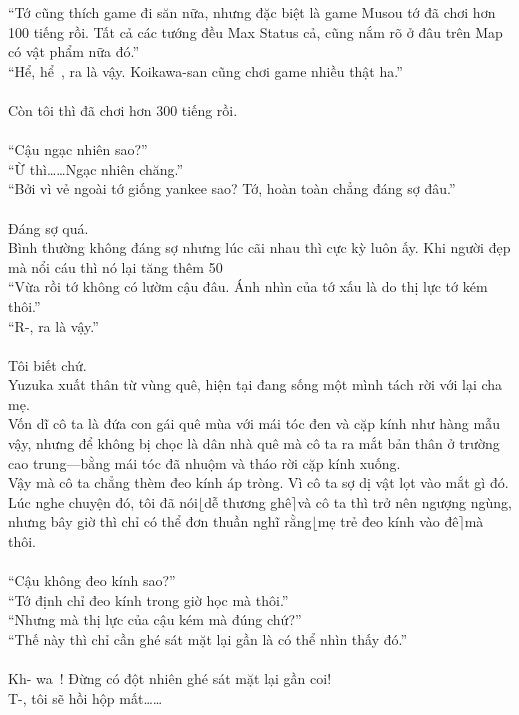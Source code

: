 \documentclass[12pt,a4paper, twosides]{book}
\begin{document}
“Tớ cũng thích game đi săn nữa, nhưng đặc biệt là game Musou tớ đã chơi hơn 100 tiếng rồi. Tất cả các tướng đều Max Status cả, cũng nắm rõ ở đâu trên Map có vật phẩm nữa đó.”\\
“Hể, hể~, ra là vậy. Koikawa-san cũng chơi game nhiều thật ha.”\\
\\
Còn tôi thì đã chơi hơn 300 tiếng rồi.\\
\\
“Cậu ngạc nhiên sao?”\\
“Ừ thì……Ngạc nhiên chăng.”\\
“Bởi vì vẻ ngoài tớ giống yankee sao? Tớ, hoàn toàn chẳng đáng sợ đâu.”\\
\\
Đáng sợ quá.\\
Bình thường không đáng sợ nhưng lúc cãi nhau thì cực kỳ luôn ấy. Khi người đẹp mà nổi cáu thì nó lại tăng thêm 50%
\\
“Vừa rồi tớ không có lườm cậu đâu. Ánh nhìn của tớ xấu là do thị lực tớ kém thôi.”\\
“R-, ra là vậy.”\\
\\
Tôi biết chứ.\\
Yuzuka xuất thân từ vùng quê, hiện tại đang sống một mình tách rời với lại cha mẹ.\\
Vốn dĩ cô ta là đứa con gái quê mùa với mái tóc đen và cặp kính như hàng mẫu vậy, nhưng để không bị chọc là dân nhà quê mà cô ta ra mắt bản thân ở trường cao trung—bằng mái tóc đã nhuộm và tháo rời cặp kính xuống.\\
Vậy mà cô ta chẳng thèm đeo kính áp tròng. Vì cô ta sợ dị vật lọt vào mắt gì đó.\\
Lúc nghe chuyện đó, tôi đã nói$\lfloor$dễ thương ghê$\rceil$và cô ta thì trở nên ngượng ngùng, nhưng bây giờ thì chỉ có thể đơn thuần nghĩ rằng$\lfloor$mẹ trẻ đeo kính vào đê$\rceil$mà thôi.\\
\\
“Cậu không đeo kính sao?”\\
“Tớ định chỉ đeo kính trong giờ học mà thôi.”\\
“Nhưng mà thị lực của cậu kém mà đúng chứ?”\\
“Thế này thì chỉ cần ghé sát mặt lại gần là có thể nhìn thấy đó.”\\
\\
Kh- wa~! Đừng có đột nhiên ghé sát mặt lại gần coi!\\
T-, tôi sẽ hồi hộp mất……\\
\end{document}
